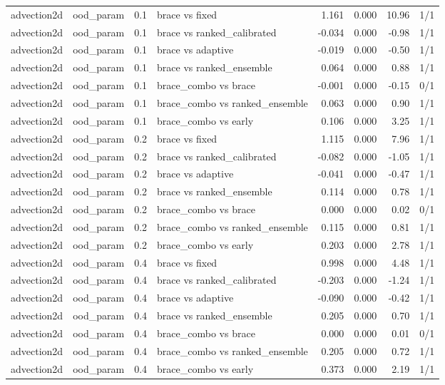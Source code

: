 \begin{tabular}{llllrrrr}
advection2d & ood\_param & 0.1 & brace vs fixed & 1.161 & 0.000 & 10.96 & 1/1 \\
advection2d & ood\_param & 0.1 & brace vs ranked\_calibrated & -0.034 & 0.000 & -0.98 & 1/1 \\
advection2d & ood\_param & 0.1 & brace vs adaptive & -0.019 & 0.000 & -0.50 & 1/1 \\
advection2d & ood\_param & 0.1 & brace vs ranked\_ensemble & 0.064 & 0.000 & 0.88 & 1/1 \\
advection2d & ood\_param & 0.1 & brace\_combo vs brace & -0.001 & 0.000 & -0.15 & 0/1 \\
advection2d & ood\_param & 0.1 & brace\_combo vs ranked\_ensemble & 0.063 & 0.000 & 0.90 & 1/1 \\
advection2d & ood\_param & 0.1 & brace\_combo vs early & 0.106 & 0.000 & 3.25 & 1/1 \\
advection2d & ood\_param & 0.2 & brace vs fixed & 1.115 & 0.000 & 7.96 & 1/1 \\
advection2d & ood\_param & 0.2 & brace vs ranked\_calibrated & -0.082 & 0.000 & -1.05 & 1/1 \\
advection2d & ood\_param & 0.2 & brace vs adaptive & -0.041 & 0.000 & -0.47 & 1/1 \\
advection2d & ood\_param & 0.2 & brace vs ranked\_ensemble & 0.114 & 0.000 & 0.78 & 1/1 \\
advection2d & ood\_param & 0.2 & brace\_combo vs brace & 0.000 & 0.000 & 0.02 & 0/1 \\
advection2d & ood\_param & 0.2 & brace\_combo vs ranked\_ensemble & 0.115 & 0.000 & 0.81 & 1/1 \\
advection2d & ood\_param & 0.2 & brace\_combo vs early & 0.203 & 0.000 & 2.78 & 1/1 \\
advection2d & ood\_param & 0.4 & brace vs fixed & 0.998 & 0.000 & 4.48 & 1/1 \\
advection2d & ood\_param & 0.4 & brace vs ranked\_calibrated & -0.203 & 0.000 & -1.24 & 1/1 \\
advection2d & ood\_param & 0.4 & brace vs adaptive & -0.090 & 0.000 & -0.42 & 1/1 \\
advection2d & ood\_param & 0.4 & brace vs ranked\_ensemble & 0.205 & 0.000 & 0.70 & 1/1 \\
advection2d & ood\_param & 0.4 & brace\_combo vs brace & 0.000 & 0.000 & 0.01 & 0/1 \\
advection2d & ood\_param & 0.4 & brace\_combo vs ranked\_ensemble & 0.205 & 0.000 & 0.72 & 1/1 \\
advection2d & ood\_param & 0.4 & brace\_combo vs early & 0.373 & 0.000 & 2.19 & 1/1 \\

\end{tabular}
